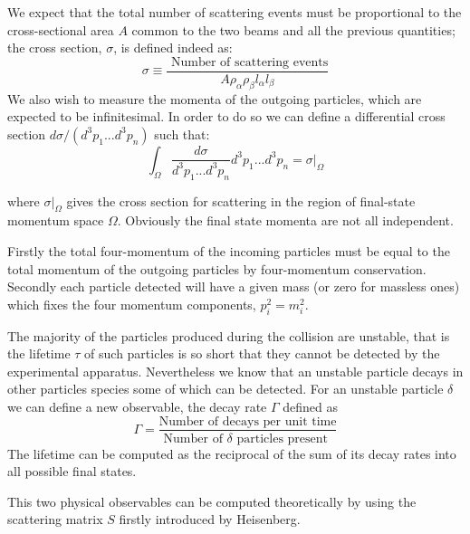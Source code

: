 \documentclass[../main/main.tex]{subfiles}
\begin{document}
We expect that the total number of scattering events must be proportional to the cross-sectional area $A$ common to the two beams and all the previous quantities; the cross section, $\sigma$, is defined indeed as:
\begin{equation}
	\sigma \equiv \frac{\text{ Number of scattering events}}{A \rho_\alpha \rho_\beta  l_\alpha l_\beta}
\end{equation}
We also wish to measure the momenta of the outgoing particles, which are expected to be infinitesimal. In order to do so we can define a differential cross section $ d \sigma/(d^3p_1...d^3p_n)$ such that:
\begin{equation}
	\int_\Omega \frac{ d \sigma}{d^3p_1...d^3p_n}d^3p_1...d^3p_n = \sigma|_\Omega
\end{equation}

where $\sigma|_\Omega$ gives the cross section for scattering in the region of final-state momentum space $\Omega$. Obviously the final state momenta are not all independent.

Firstly the total four-momentum of the incoming particles must be equal to the total momentum of the outgoing particles by four-momentum conservation. Secondly each particle detected will have a given mass (or zero for massless ones) which fixes the four momentum components, $p_i^2 = m_i^2$.

The majority of the particles produced during the collision are unstable, that is the lifetime $\tau$ of 
such particles is so short that they cannot be detected by the experimental apparatus.
Nevertheless we know that an unstable particle decays in other particles species some of which can be detected. 
For an unstable particle $\delta$  we can define a new observable, the decay rate $\Gamma$ defined as 
\begin{equation}
	\Gamma = \frac{\text{Number of decays per unit time}}{\text{Number of  $\delta$  particles present }}
\end{equation}
The lifetime can be computed as the reciprocal of the sum of its decay rates into all possible final states.

This two physical observables can be computed theoretically by using the scattering matrix $S$ firstly introduced by Heisenberg.
\end{document}
